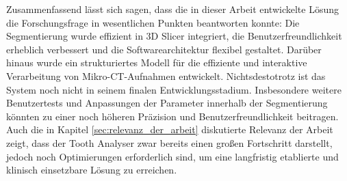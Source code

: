 Zusammenfassend lässt sich sagen, dass die in dieser Arbeit entwickelte Lösung die
Forschungsfrage in wesentlichen Punkten beantworten konnte: Die Segmentierung
wurde effizient in 3D Slicer integriert, die Benutzerfreundlichkeit erheblich verbessert
und die Softwarearchitektur flexibel gestaltet. Darüber hinaus wurde ein
strukturiertes Modell für die effiziente und interaktive Verarbeitung von Mikro-\ac{CT}-Aufnahmen
entwickelt. Nichtsdestotrotz ist das System noch nicht in seinem finalen Entwicklungsstadium.
Insbesondere weitere Benutzertests und Anpassungen der Parameter innerhalb der
Segmentierung könnten zu einer noch höheren Präzision und Benutzerfreundlichkeit
beitragen. Auch die in Kapitel \ref{sec:relevanz_der_arbeit} diskutierte Relevanz
der Arbeit zeigt, dass der Tooth Analyser zwar bereits einen großen Fortschritt
darstellt, jedoch noch Optimierungen erforderlich sind, um eine langfristig
etablierte und klinisch einsetzbare Lösung zu erreichen.
